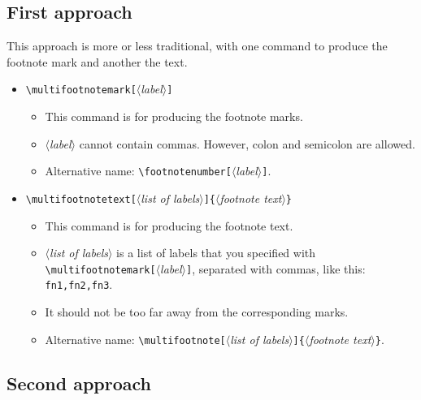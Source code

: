 \documentclass[classical]{einfart}
\newcommand{\meta}[1]{$\langle${\normalfont\itshape#1}$\rangle$}
\newcommand{\commandoption}[1]{\textcolor{code-keys}{\texttt{#1}}}
\begin{document}
\subsection{First approach}

This approach is more or less traditional, with one command to produce the footnote mark and another the text.
\begin{itemize}
    \item \lstinline|\multifootnotemark[|\meta{label}\lstinline|]|
    \begin{itemize}
        \item This command is for producing the footnote marks.
        \item \meta{label} cannot contain commas. However, colon \textquote{\texttt{:}} and semicolon \textquote{\texttt{;}} are allowed.
        \item Alternative name: \lstinline|\footnotenumber[|\meta{label}\lstinline|]|.
    \end{itemize}
    \item \lstinline|\multifootnotetext[|\meta{list of labels}\lstinline|]{|\meta{footnote text}\lstinline|}|
    \begin{itemize}
        \item This command is for producing the footnote text.
        \item \meta{list of labels} is a list of labels that you specified with \lstinline|\multifootnotemark[|\meta{label}\lstinline|]|, separated with commas, like this: \commandoption{fn1,fn2,fn3}.
        \item It should not be too far away from the corresponding marks.
        \item Alternative name: \lstinline|\multifootnote[|\meta{list of labels}\lstinline|]{|\meta{footnote text}\lstinline|}|.
    \end{itemize}
\end{itemize}

\subsection{Second approach}
\end{document}
